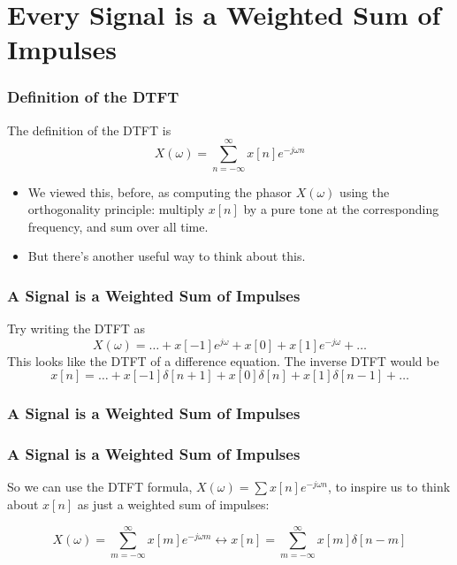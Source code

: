 \documentclass{beamer}
\begin{document}
\section[Impulses]{Every Signal is a Weighted Sum of Impulses}
\setcounter{subsection}{1}

\begin{frame}
  \frametitle{Definition of the DTFT}

  The definition of the DTFT is
  \[
  X(\omega)  = \sum_{n=-\infty}^\infty x[n]e^{-j\omega n}
  \]
  \begin{itemize}
  \item We viewed this, before, as computing the phasor $X(\omega)$ using
    the orthogonality principle: multiply $x[n]$ by a pure tone at the
    corresponding frequency, and sum over all time.
  \item But there's another useful way to think about this.
  \end{itemize}
\end{frame}

\begin{frame}
  \frametitle{A Signal is a Weighted Sum of Impulses}

  Try writing the DTFT as
  \[
  X(\omega) = \ldots + x[-1]e^{j\omega} + x[0] + x[1]e^{-j\omega} + \ldots
  \]
  This looks like the DTFT of a difference equation.  The inverse DTFT would be
  \[
  x[n] = \ldots + x[-1]\delta[n+1] + x[0]\delta[n] + x[1]\delta[n-1] + \ldots
  \]
\end{frame}
  
\begin{frame}
  \frametitle{A Signal is a Weighted Sum of Impulses}
  
  \centerline{}

\end{frame}

\begin{frame}
  \frametitle{A Signal is a Weighted Sum of Impulses}

  So we can use the DTFT formula, $X(\omega)=\sum x[n]e^{-j\omega n}$,
  to inspire us to think about $x[n]$ as just a weighted sum of impulses:

  \vspace*{1cm}
  
  \[
  X(\omega)=\sum_{m=-\infty}^\infty x[m]e^{-j\omega m}
  \leftrightarrow x[n]=\sum_{m=-\infty}^\infty x[m]\delta[n-m]
  \]
\end{frame}
\end{document}
